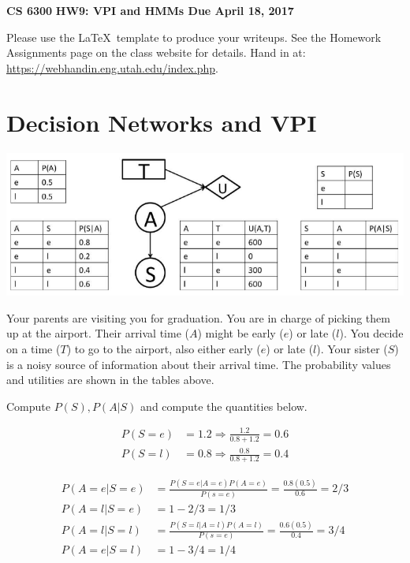 \documentclass[12pt]{article}
\begin{document}
\begin{center}
{\bf CS 6300} \hfill {\large\bf HW9: VPI and HMMs \hfill Due April 18, 2017}
\end{center}

\noindent
Please use the \LaTeX\ template to produce your writeups. See the
Homework Assignments page on the class website for details.  Hand in
at: \url{https://webhandin.eng.utah.edu/index.php}.

\section{Decision Networks and VPI}

\begin{center}
\includegraphics[width=6in]{prob1.png}
\end{center}

Your parents are visiting you for graduation.  You are in charge of
picking them up at the airport.  Their arrival time ($A$) might be
early ($e$) or late ($l$).  You decide on a time ($T$) to go to the
airport, also either early ($e$) or late ($l$).  Your sister ($S$) is
a noisy source of information about their arrival time. The
probability values and utilities are shown in the tables above.

Compute $P(S), P(A|S)$ and compute the quantities below. 

\begin{align*}
P(S=e) &= 1.2 \Rightarrow \frac{1.2}{0.8 + 1.2} = 0.6\\
P(S=l) &= 0.8 \Rightarrow \frac{0.8}{0.8 + 1.2} = 0.4
\end{align*}

\begin{align*}
P(A=e|S=e) &= \frac{P(S=e|A=e)P(A=e)}{P(s=e)} = \frac{0.8(0.5)}{0.6} = 2/3\\
P(A=l|S=e) &= 1 - 2/3 = 1/3\\
P(A=l|S=l) &= \frac{P(S=l|A=l)P(A=l)}{P(s=e)} = \frac{0.6(0.5)}{0.4} = 3/4\\
P(A=e|S=l) &= 1 - 3/4 = 1/4
\end{align*}
\end{document}
